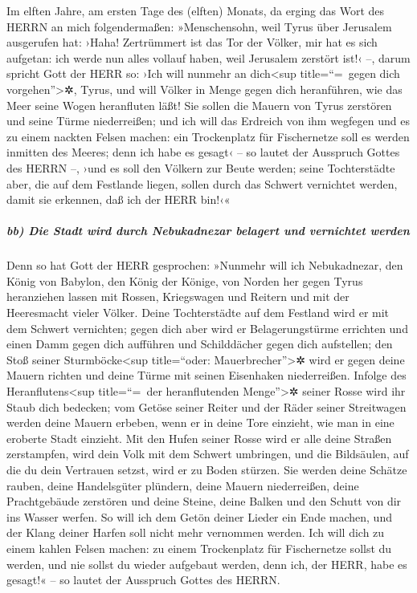 Im elften Jahre, am ersten Tage des (elften) Monats, da
erging das Wort des HERRN an mich folgendermaßen:
»Menschensohn, weil Tyrus über Jerusalem ausgerufen hat:
›Haha! Zertrümmert ist das Tor der Völker, mir hat es sich aufgetan: ich
werde nun alles vollauf haben, weil Jerusalem zerstört ist!‹ --,
darum spricht Gott der HERR so: ›Ich will nunmehr an
dich\textless sup title=``=~gegen dich vorgehen''\textgreater✲, Tyrus,
und will Völker in Menge gegen dich heranführen, wie das Meer seine
Wogen heranfluten läßt! Sie sollen die Mauern von Tyrus
zerstören und seine Türme niederreißen; und ich will das Erdreich von
ihm wegfegen und es zu einem nackten Felsen machen: ein
Trockenplatz für Fischernetze soll es werden inmitten des Meeres; denn
ich habe es gesagt‹ -- so lautet der Ausspruch Gottes des HERRN --, ›und
es soll den Völkern zur Beute werden; seine Tochterstädte
aber, die auf dem Festlande liegen, sollen durch das Schwert vernichtet
werden, damit sie erkennen, daß ich der HERR bin!‹«

\hypertarget{bb-die-stadt-wird-durch-nebukadnezar-belagert-und-vernichtet-werden}{%
\subparagraph{bb) Die Stadt wird durch Nebukadnezar belagert und
vernichtet
werden}\label{bb-die-stadt-wird-durch-nebukadnezar-belagert-und-vernichtet-werden}}

Denn so hat Gott der HERR gesprochen: »Nunmehr will ich
Nebukadnezar, den König von Babylon, den König der Könige, von Norden
her gegen Tyrus heranziehen lassen mit Rossen, Kriegswagen und Reitern
und mit der Heeresmacht vieler Völker. Deine Tochterstädte
auf dem Festland wird er mit dem Schwert vernichten; gegen dich aber
wird er Belagerungstürme errichten und einen Damm gegen dich aufführen
und Schilddächer gegen dich aufstellen; den Stoß seiner
Sturmböcke\textless sup title=``oder: Mauerbrecher''\textgreater✲ wird
er gegen deine Mauern richten und deine Türme mit seinen Eisenhaken
niederreißen. Infolge des Heranflutens\textless sup
title=``=~der heranflutenden Menge''\textgreater✲ seiner Rosse wird ihr
Staub dich bedecken; vom Getöse seiner Reiter und der Räder seiner
Streitwagen werden deine Mauern erbeben, wenn er in deine Tore einzieht,
wie man in eine eroberte Stadt einzieht. Mit den Hufen
seiner Rosse wird er alle deine Straßen zerstampfen, wird dein Volk mit
dem Schwert umbringen, und die Bildsäulen, auf die du dein Vertrauen
setzst, wird er zu Boden stürzen. Sie werden deine
Schätze rauben, deine Handelsgüter plündern, deine Mauern niederreißen,
deine Prachtgebäude zerstören und deine Steine, deine Balken und den
Schutt von dir ins Wasser werfen. So will ich dem Getön
deiner Lieder ein Ende machen, und der Klang deiner Harfen soll nicht
mehr vernommen werden. Ich will dich zu einem kahlen
Felsen machen: zu einem Trockenplatz für Fischernetze sollst du werden,
und nie sollst du wieder aufgebaut werden, denn ich, der HERR, habe es
gesagt!« -- so lautet der Ausspruch Gottes des HERRN.

